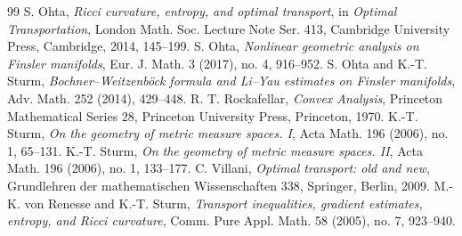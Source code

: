 \documentclass[10pt,a4paper]{amsart}
\numberwithin{equation}{section}
\begin{document}
\begin{thebibliography}{99}
 S. Ohta, \emph{Ricci curvature, entropy, and optimal transport}, in \emph{Optimal Transportation}, London Math. Soc. Lecture Note Ser. 413, Cambridge University Press, Cambridge, 2014, 145--199.
 S. Ohta, \emph{Nonlinear geometric analysis on Finsler manifolds}, Eur. J. Math. 3 (2017), no. 4, 916--952.
 S. Ohta and K.-T. Sturm, \emph{Bochner--Weitzenb\"ock formula and Li--Yau estimates on Finsler manifolds}, Adv. Math. 252 (2014), 429--448.
 R. T. Rockafellar, \emph{Convex Analysis}, Princeton Mathematical Series 28, Princeton University Press, Princeton, 1970.
 K.-T. Sturm, \emph{On the geometry of metric measure spaces. I}, Acta Math. 196 (2006), no. 1, 65--131.
 K.-T. Sturm, \emph{On the geometry of metric measure spaces. II}, Acta Math. 196 (2006), no. 1, 133--177.
 C. Villani, \emph{Optimal transport: old and new}, Grundlehren der mathematischen Wissenschaften 338, Springer, Berlin, 2009.
 M.-K. von Renesse and K.-T. Sturm, \emph{Transport inequalities, gradient estimates, entropy, and Ricci curvature}, Comm. Pure Appl. Math. 58 (2005), no. 7, 923--940.
\end{thebibliography}
\end{document}
